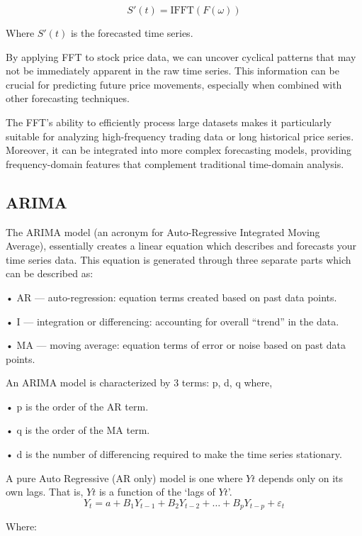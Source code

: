 \documentclass{ieeeojies}
\begin{document}
\begin{equation}
S'(t) = \text{IFFT}(F(\omega))
\end{equation}

Where $S'(t)$ is the forecasted time series.

By applying FFT to stock price data, we can uncover cyclical patterns that may not be immediately apparent in the raw time series. This information can be crucial for predicting future price movements, especially when combined with other forecasting techniques.

The FFT's ability to efficiently process large datasets makes it particularly suitable for analyzing high-frequency trading data or long historical price series. Moreover, it can be integrated into more complex forecasting models, providing frequency-domain features that complement traditional time-domain analysis.
\subsection{ARIMA }
The ARIMA model (an acronym for Auto-Regressive Integrated Moving Average), essentially creates a linear equation which describes and forecasts your time series data. This equation is generated through three separate parts which can be described as:

•	AR — auto-regression: equation terms created based on past data points.

•	I — integration or differencing: accounting for overall “trend” in the data.

•	MA — moving average: equation terms of error or noise based on past data points.

An ARIMA model is characterized by 3 terms: p, d, q
where,

•	p is the order of the AR term.

•	q is the order of the MA term.

•	d is the number of differencing required to make the time series stationary.

A pure Auto Regressive (AR only) model is one where $Yt$ depends only on its own lags. That is, $Yt$ is a function of the ‘lags of $Yt$’.
\begin{equation*}
 Y_t = a + B_1 Y_{t-1} + B_2 Y_{t-2} + \ldots + B_p Y_{t-p} + \varepsilon_t
\end{equation*}

Where:
\end{document}
